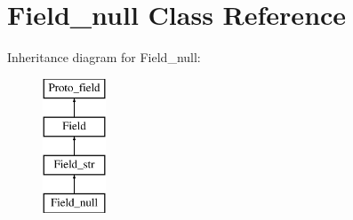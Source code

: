 \hypertarget{classField__null}{}\section{Field\+\_\+null Class Reference}
\label{classField__null}
Inheritance diagram for Field\+\_\+null\+:\begin{figure}[H]
\begin{center}
\leavevmode
\includegraphics[height=4.000000cm]{classField__null}
\end{center}
\end{figure}

